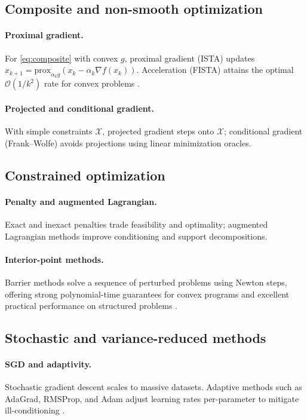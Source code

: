 \subsection{Composite and non-smooth optimization}
\paragraph{Proximal gradient.} For \eqref{eq:composite} with convex $g$, proximal gradient (ISTA) updates $x_{k+1}=\mathrm{prox}_{\alpha_k g}(x_k-\alpha_k\nabla f(x_k))$. Acceleration (FISTA) attains the optimal $\mathcal{O}(1/k^2)$ rate for convex problems \cite{beck2009fista,parikh2014prox}.

\paragraph{Projected and conditional gradient.} With simple constraints $\mathcal{X}$, projected gradient steps onto $\mathcal{X}$; conditional gradient (Frank–Wolfe) avoids projections using linear minimization oracles.

\subsection{Constrained optimization}
\paragraph{Penalty and augmented Lagrangian.} Exact and inexact penalties trade feasibility and optimality; augmented Lagrangian methods improve conditioning and support decompositions.

\paragraph{Interior-point methods.} Barrier methods solve a sequence of perturbed problems using Newton steps, offering strong polynomial-time guarantees for convex programs and excellent practical performance on structured problems \cite{wright1997primaldual,nesterov1994ipm}.

\subsection{Stochastic and variance-reduced methods}
\paragraph{SGD and adaptivity.} Stochastic gradient descent scales to massive datasets. Adaptive methods such as AdaGrad, RMSProp, and Adam adjust learning rates per-parameter to mitigate ill-conditioning \cite{duchi2011adagrad,tieleman2012rmsprop,kingma2015adam}.

